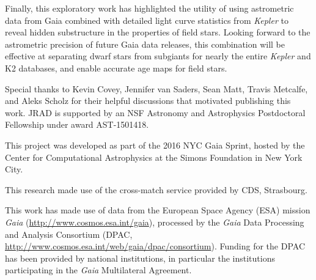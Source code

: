 \documentclass[manuscript, letterpaper]{aastex6}
\newcommand{\Kepler}{\textsl{Kepler}\xspace}
\begin{document}
Finally, this exploratory work has highlighted the utility of using astrometric data from Gaia combined with detailed light curve statistics from \Kepler to reveal hidden substructure in the properties of field stars. Looking forward to the astrometric precision of future Gaia data releases, this combination will be effective at separating dwarf stars from subgiants for nearly the entire \Kepler and K2 databases, and enable accurate age maps for field stars.



\acknowledgments
Special thanks to Kevin Covey, Jennifer van Saders, Sean Matt, Travis Metcalfe, and Aleks Scholz for their helpful discussions that motivated publishing this work. JRAD is supported by an NSF Astronomy and Astrophysics Postdoctoral Fellowship under award AST-1501418. 

This project was developed as part of the 2016 NYC Gaia Sprint, hosted by the Center for Computational Astrophysics at the Simons Foundation in New York City.

This research made use of the cross-match service provided by CDS, Strasbourg.

This work has made use of data from the European Space Agency (ESA)
mission {\it Gaia} (\url{http://www.cosmos.esa.int/gaia}), processed by
the {\it Gaia} Data Processing and Analysis Consortium (DPAC,
\url{http://www.cosmos.esa.int/web/gaia/dpac/consortium}). Funding
for the DPAC has been provided by national institutions, in particular
the institutions participating in the {\it Gaia} Multilateral Agreement.
\end{document}
